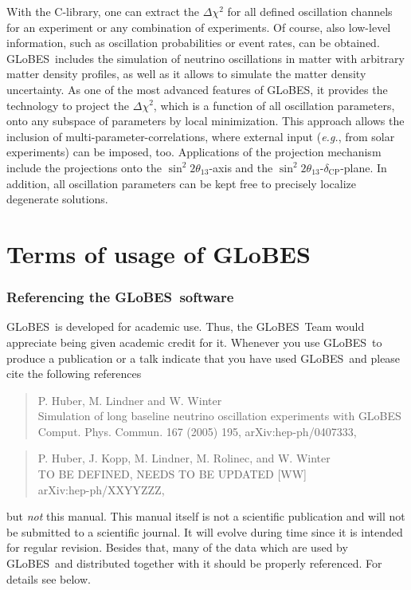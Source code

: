 \documentclass[a4paper,12pt,twoside]{book}
\newcommand{\glbxxx}{hep-ph/0407333}
\newcommand{\glbxxxtwo}{hep-ph/XXYYZZZ}
\newcommand{\deltacp}{\delta_{\mathrm{CP}}}
\newcommand{\stheta}{\sin^2 2 \theta_{13}}
\newcommand{\eg}{{\it e.g.}}
\newcommand{\GLOBES}{{\sf GLoBES}}
\begin{document}
With the C-library, one can extract the $\Delta \chi^2$ for all defined 
oscillation channels for an experiment or any combination of experiments.
Of course, also low-level information, such as oscillation
probabilities or event rates, can be obtained. \GLOBES\ includes the
simulation of neutrino oscillations in matter with arbitrary matter 
density profiles, as well as it allows to simulate the matter density
uncertainty. As one of the most
advanced features of \GLOBES , it provides the technology to 
project the $\Delta \chi^2$, which is a function of all oscillation
parameters, onto any subspace of parameters by local minimization. 
This approach allows the inclusion of multi-parameter-correlations,
where external input (\eg, from solar experiments) can be imposed, too.
Applications of the projection mechanism include the projections onto the $\stheta$-axis and the $\stheta$-$\deltacp$-plane. In addition, all oscillation parameters can be kept free to precisely localize 
degenerate solutions.

\chapter*{Terms of usage of \GLOBES}

\subsection*{Referencing the \GLOBES\ software}

\GLOBES\ is developed for academic use. Thus, the \GLOBES\ Team would
appreciate being given academic credit for it. Whenever you use \GLOBES\
to produce a publication or a talk indicate that you have used \GLOBES\ and
please cite the following references~\cite{globes_paper,globes_paper_two}
\begin{quote}
P. Huber, M. Lindner and W. Winter\\
Simulation of long baseline neutrino oscillation experiments with \GLOBES\\
Comput. Phys. Commun. 167 (2005) 195, arXiv:\glbxxx,
\end{quote}

\begin{quote}
P. Huber, J. Kopp, M. Lindner, M. Rolinec, and W. Winter\\
TO BE DEFINED, NEEDS TO BE UPDATED [WW]\\
arXiv:\glbxxxtwo,
\end{quote}
but \emph{not} this manual. This manual itself is not a scientific 
publication and will not be submitted to a scientific journal. 
It will evolve during time since it is intended for 
regular revision. Besides that, many of the data which are used by \GLOBES\ 
and distributed together with it should be properly referenced. 
For details see below.
\end{document}
